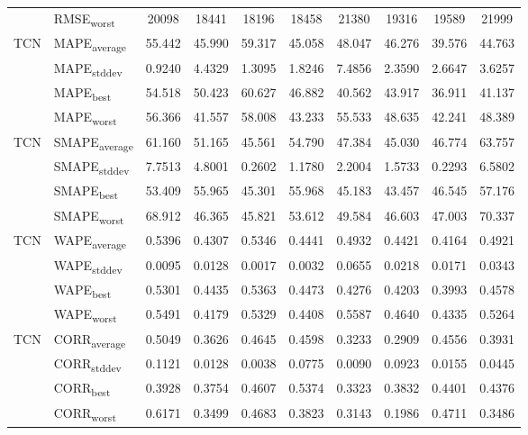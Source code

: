 {\begin{longtable}{l l c c c c c c c c}
 & RMSE\textsubscript{worst} & 20098 & 18441 & 18196 & 18458 & 21380 & 19316 & 19589 & 21999 \\
\cmidrule(lr){2-10}
\multirow{4}{*}{TCN} & MAPE\textsubscript{average} & 55.442 & 45.990 & 59.317 & 45.058 & 48.047 & 46.276 & 39.576 & 44.763 \\
 & MAPE\textsubscript{stddev} & 0.9240 & 4.4329 & 1.3095 & 1.8246 & 7.4856 & 2.3590 & 2.6647 & 3.6257 \\
 & MAPE\textsubscript{best} & 54.518 & 50.423 & 60.627 & 46.882 & 40.562 & 43.917 & 36.911 & 41.137 \\
 & MAPE\textsubscript{worst} & 56.366 & 41.557 & 58.008 & 43.233 & 55.533 & 48.635 & 42.241 & 48.389 \\
\cmidrule(lr){2-10}
\multirow{4}{*}{TCN} & SMAPE\textsubscript{average} & 61.160 & 51.165 & 45.561 & 54.790 & 47.384 & 45.030 & 46.774 & 63.757 \\
 & SMAPE\textsubscript{stddev} & 7.7513 & 4.8001 & 0.2602 & 1.1780 & 2.2004 & 1.5733 & 0.2293 & 6.5802 \\
 & SMAPE\textsubscript{best} & 53.409 & 55.965 & 45.301 & 55.968 & 45.183 & 43.457 & 46.545 & 57.176 \\
 & SMAPE\textsubscript{worst} & 68.912 & 46.365 & 45.821 & 53.612 & 49.584 & 46.603 & 47.003 & 70.337 \\
\cmidrule(lr){2-10}
\multirow{4}{*}{TCN} & WAPE\textsubscript{average} & 0.5396 & 0.4307 & 0.5346 & 0.4441 & 0.4932 & 0.4421 & 0.4164 & 0.4921 \\
 & WAPE\textsubscript{stddev} & 0.0095 & 0.0128 & 0.0017 & 0.0032 & 0.0655 & 0.0218 & 0.0171 & 0.0343 \\
 & WAPE\textsubscript{best} & 0.5301 & 0.4435 & 0.5363 & 0.4473 & 0.4276 & 0.4203 & 0.3993 & 0.4578 \\
 & WAPE\textsubscript{worst} & 0.5491 & 0.4179 & 0.5329 & 0.4408 & 0.5587 & 0.4640 & 0.4335 & 0.5264 \\
\cmidrule(lr){2-10}
\multirow{4}{*}{TCN} & CORR\textsubscript{average} & 0.5049 & 0.3626 & 0.4645 & 0.4598 & 0.3233 & 0.2909 & 0.4556 & 0.3931 \\
 & CORR\textsubscript{stddev} & 0.1121 & 0.0128 & 0.0038 & 0.0775 & 0.0090 & 0.0923 & 0.0155 & 0.0445 \\
 & CORR\textsubscript{best} & 0.3928 & 0.3754 & 0.4607 & 0.5374 & 0.3323 & 0.3832 & 0.4401 & 0.4376 \\
 & CORR\textsubscript{worst} & 0.6171 & 0.3499 & 0.4683 & 0.3823 & 0.3143 & 0.1986 & 0.4711 & 0.3486 \\

\end{longtable}}
